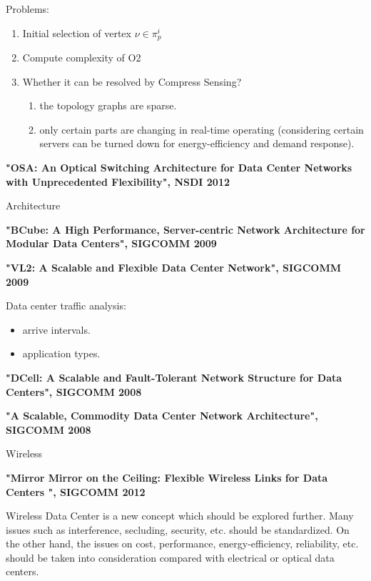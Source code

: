 \documentclass[journal,onecolumn,11pt]{IEEEtran}
\begin{document}
Problems:
\begin{enumerate}
  \item Initial selection of vertex $\nu\in\pi_p^i$
  \item Compute complexity of O2
  \item Whether it can be resolved by Compress Sensing?
  \begin{enumerate}
    \item the topology graphs are sparse.
    \item only certain parts are changing in real-time operating (considering certain servers can be turned down for energy-efficiency and demand response).
  \end{enumerate}
\end{enumerate}

\textbf{"OSA: An Optical Switching Architecture for Data Center Networks with Unprecedented Flexibility", NSDI 2012}

Architecture

\textbf{"BCube: A High Performance, Server-centric Network Architecture for Modular Data Centers", SIGCOMM 2009}

\textbf{"VL2: A Scalable and Flexible Data Center Network", SIGCOMM 2009}

Data center traffic analysis:
\begin{itemize}
  \item arrive intervals.
  \item application types.
\end{itemize}

\textbf{"DCell: A Scalable and Fault-Tolerant Network Structure for Data Centers", SIGCOMM 2008}

\textbf{"A Scalable, Commodity Data Center Network Architecture", SIGCOMM 2008}

Wireless

\textbf{"Mirror Mirror on the Ceiling: Flexible Wireless Links for Data Centers ", SIGCOMM 2012}

Wireless Data Center is a new concept which should be explored further. Many issues such as interference, secluding, security, etc. should be standardized. On the other hand, the issues on cost, performance, energy-efficiency, reliability, etc. should be taken into consideration compared with electrical or optical data centers.

\end{document}
